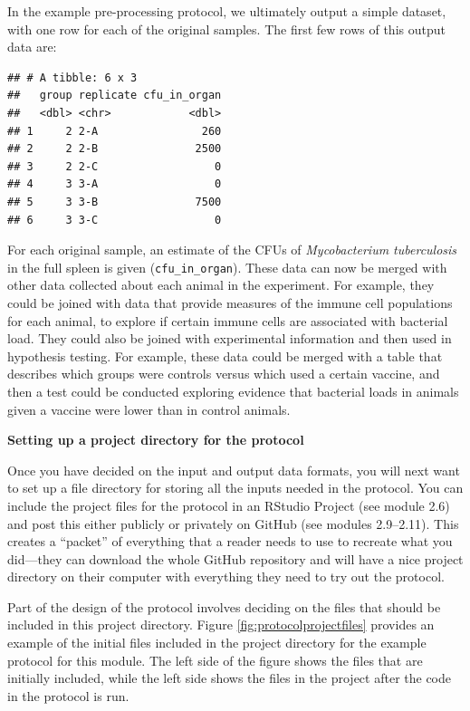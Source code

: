 \documentclass[]{tufte-book}
\begin{document}
In the example pre-processing protocol, we ultimately
output a simple dataset, with one row for each of the original samples. The
first few rows of this output data are:

\begin{verbatim}
## # A tibble: 6 x 3
##   group replicate cfu_in_organ
##   <dbl> <chr>            <dbl>
## 1     2 2-A                260
## 2     2 2-B               2500
## 3     2 2-C                  0
## 4     3 3-A                  0
## 5     3 3-B               7500
## 6     3 3-C                  0
\end{verbatim}

For each original sample, an estimate of the CFUs of \emph{Mycobacterium
tuberculosis} in the full spleen is given (\texttt{cfu\_in\_organ}). These data
can now be merged with other data collected about each animal in the experiment.
For example, they could be joined with data that provide measures of the
immune cell populations for each animal, to explore if certain immune
cells are associated with bacterial load. They could also be joined with
experimental information and then used in hypothesis testing. For example,
these data could be merged with a table that describes which groups were
controls versus which used a certain vaccine, and then a test could be
conducted exploring evidence that bacterial loads in animals given a
vaccine were lower than in control animals.

\textbf{Setting up a project directory for the protocol}

Once you have decided on the input and output data formats, you will next want
to set up a file directory for storing all the inputs needed in the protocol.
You can include the project files for the protocol in an RStudio Project (see
module 2.6) and post this either publicly or privately on GitHub (see modules
2.9--2.11). This creates a ``packet'' of everything that a reader needs to use to
recreate what you did---they can download the whole GitHub repository and will
have a nice project directory on their computer with everything they need to try
out the protocol.

Part of the design of the protocol involves deciding on the files that should be
included in this project directory. Figure \ref{fig:protocolprojectfiles}
provides an example of the initial files included in the project directory for
the example protocol for this module. The left side of the figure shows the
files that are initially included, while the left side shows the files in the
project after the code in the protocol is run.
\end{document}
